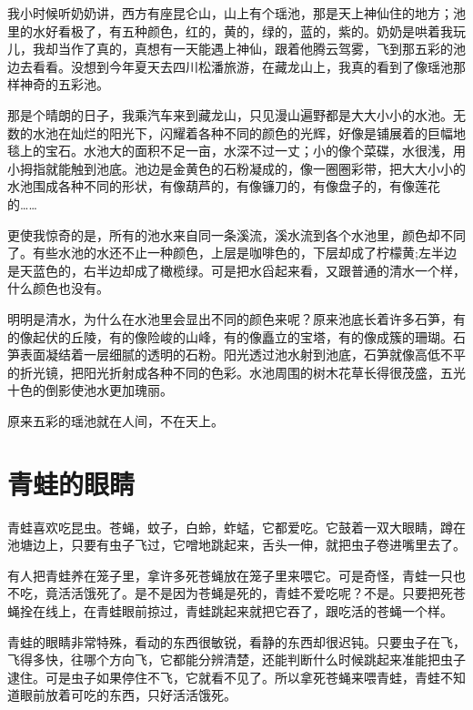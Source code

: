\documentclass[12pt,UTF-8,openany]{ctexbook}
\begin{document}
\begin{Large}
    
    我小时候听奶奶讲，西方有座昆仑山，山上有个瑶池，那是天上神仙住的地方；池里的水好看极了，有五种颜色，红的，黄的，绿的，蓝的，紫的。奶奶是哄着我玩儿，我却当作了真的，真想有一天能遇上神仙，跟着他腾云驾雾，飞到那五彩的池边去看看。没想到今年夏天去四川松潘旅游，在藏龙山上，我真的看到了像瑶池那样神奇的五彩池。
    
    那是个晴朗的日子，我乘汽车来到藏龙山，只见漫山遍野都是大大小小的水池。无数的水池在灿烂的阳光下，闪耀着各种不同的颜色的光辉，好像是铺展着的巨幅地毯上的宝石。水池大的面积不足一亩，水深不过一丈；小的像个菜碟，水很浅，用小拇指就能触到池底。池边是金黄色的石粉凝成的，像一圈圈彩带，把大大小小的水池围成各种不同的形状，有像葫芦的，有像镰刀的，有像盘子的，有像莲花的……
    
    更使我惊奇的是，所有的池水来自同一条溪流，溪水流到各个水池里，颜色却不同了。有些水池的水还不止一种颜色，上层是咖啡色的，下层却成了柠檬黄;左半边是天蓝色的，右半边却成了橄榄绿。可是把水舀起来看，又跟普通的清水一个样，什么颜色也没有。
    
    明明是清水，为什么在水池里会显出不同的颜色来呢？原来池底长着许多石笋，有的像起伏的丘陵，有的像险峻的山峰，有的像矗立的宝塔，有的像成簇的珊瑚。石笋表面凝结着一层细腻的透明的石粉。阳光透过池水射到池底，石笋就像高低不平的折光镜，把阳光折射成各种不同的色彩。水池周围的树木花草长得很茂盛，五光十色的倒影使池水更加瑰丽。
    
    原来五彩的瑶池就在人间，不在天上。
    
\end{Large}

\chapter{青蛙的眼睛}

\begin{Large}
    
    青蛙喜欢吃昆虫。苍蝇，蚊子，白蛉，蚱蜢，它都爱吃。它鼓着一双大眼睛，蹲在池塘边上，只要有虫子飞过，它噌地跳起来，舌头一伸，就把虫子卷进嘴里去了。
    
    有人把青蛙养在笼子里，拿许多死苍蝇放在笼子里来喂它。可是奇怪，青蛙一只也不吃，竟活活饿死了。是不是因为苍蝇是死的，青蛙不爱吃呢？不是。只要把死苍蝇拴在线上，在青蛙眼前掠过，青蛙跳起来就把它吞了，跟吃活的苍蝇一个样。
    
    青蛙的眼睛非常特殊，看动的东西很敏锐，看静的东西却很迟钝。只要虫子在飞，飞得多快，往哪个方向飞，它都能分辨清楚，还能判断什么时候跳起来准能把虫子逮住。可是虫子如果停住不飞，它就看不见了。所以拿死苍蝇来喂青蛙，青蛙不知道眼前放着可吃的东西，只好活活饿死。
    
\end{Large}
\end{document}
